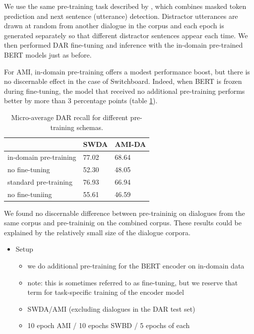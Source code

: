 \documentclass[11pt,a4paper]{article}
\begin{document}
We use the same pre-training task described by \citet{devlinBERTPretrainingDeep2018}, which combines masked token prediction and next sentence (utterance) detection. 
Distractor utterances are drawn at random from another dialogue in the corpus
and each epoch is generated separately so that different distractor sentences appear each time.
We then performed DAR fine-tuning and inference with the in-domain pre-trained BERT models just as before.

For AMI, in-domain pre-training offers a modest performance boost, but there is no discernable effect in the case of Switchboard.
Indeed, when BERT is frozen during fine-tuning, the model that received no additional pre-training performs better by more than 3 percentage points (table \ref{tab:exp3-recall}).

\begin{table}[]
\begin{tabular}{@{}lll@{}}
\toprule
                       & SWDA  & AMI-DA \\ \midrule
in-domain pre-training & 77.02 & 68.64  \\
no fine-tuning         & 52.30 & 48.05  \\ \midrule
standard pre-training  & 76.93 & 66.94  \\
no fine-tuniing        & 55.61 & 46.59  \\ \bottomrule
\end{tabular}
  \caption{Micro-average DAR recall for different pre-training schemas.}
  \label{tab:exp3-recall}
\end{table}

We found no discernable difference between pre-traininig on dialogues from the same corpus and pre-traininig on the combined corpus.
These results could be explained by the relatively small size of the dialogue corpora.

\begin{itemize}
  \item Setup
    \begin{itemize}
      \item we do additional pre-training for the BERT encoder on in-domain data
      \item note: this is sometimes referred to as fine-tuning, but we reserve that term for task-specific training of the encoder model

      \item SWDA/AMI (excluding dialogues in the DAR test set)
      \item 10 epoch AMI / 10 epochs SWBD / 5 epochs of each
    \end{itemize}
\end{itemize}
\end{document}
